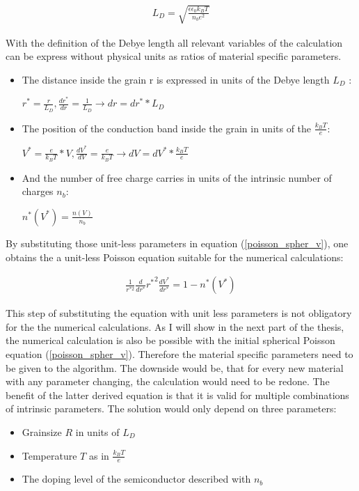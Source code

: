 \documentclass[11pt]{article}
\providecommand{\tightlist}{%
      \setlength{\itemsep}{0pt}\setlength{\parskip}{0pt}}
\begin{document}
\begin{align}
L_{D}=\sqrt{\frac{\epsilon\epsilon_{0}k_{B}T}{n_{b}e^{2}}}
\end{align}

With the definition of the Debye length all relevant variables of the
calculation can be express without physical units as ratios of material
specific parameters.

\begin{itemize}
\item
  The distance inside the grain r is expressed in units of the Debye
  length \(L_{D}\) :

  \(r^{*}=\frac{r}{L_{D}}, \frac{dr^{*}}{dr}=\frac{1}{L_{D}}\longrightarrow dr=dr^{*}*L_{D}\)
\item
  The position of the conduction band inside the grain in units of the
  \(\frac{k_{B}T}{e}\):

  \(V^{*}=\frac{e}{k_{B}T}*V, \frac{dV^{*}}{dV}=\frac{e}{k_{B}T}\longrightarrow dV=dV^{*}*\frac{k_{B}T}{e}\)
\item
  And the number of free charge carries in units of the intrinsic number
  of charges \(n_b\):

  \(n^{*}(V^{*})=\frac{n(V)}{n_{b}}\)
\end{itemize}

By substituting those unit-less parameters in equation
(\ref{poisson_spher_v}), one obtains the a unit-less Poisson equation
suitable for the numerical calculations:

\begin{align}
\frac{1}{r^{*2}}\frac{d}{dr^{*}}{r^{*}}^{2}\frac{dV^{*}}{dr^{*}}=1-n^{*}(V^{*})\label{poisson_no_units}\tag{Unitless Poisson equation}
\end{align}

This step of substituting the equation with unit less parameters is not
obligatory for the the numerical calculations. As I will show in the
next part of the thesis, the numerical calculation is also be possible
with the initial spherical Poisson equation (\ref{poisson_spher_v}).
Therefore the material specific parameters need to be given to the
algorithm. The downside would be, that for every new material with any
parameter changing, the calculation would need to be redone. The benefit
of the latter derived equation is that it is valid for multiple
combinations of intrinsic parameters. The solution would only depend on
three parameters:

\begin{itemize}
\tightlist
\item
  Grainsize \(R\) in units of \(L_{D}\)
\item
  Temperature \(T\) as in \(\frac{k_{B}T}{e}\)
\item
  The doping level of the semiconductor described with \(n_b\)
\end{itemize}
\end{document}
